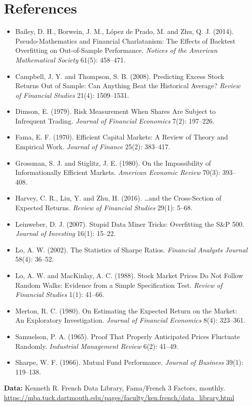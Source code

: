 \section*{References}

\begin{itemize}
  \item Bailey, D. H., Borwein, J. M., L\'opez de Prado, M. and Zhu, Q. J. (2014). Pseudo-Mathematics and Financial Charlatanism: The Effects of Backtest Overfitting on Out-of-Sample Performance. \emph{Notices of the American Mathematical Society} 61(5): 458--471.
  \item Campbell, J. Y. and Thompson, S. B. (2008). Predicting Excess Stock Returns Out of Sample: Can Anything Beat the Historical Average? \emph{Review of Financial Studies} 21(4): 1509--1531.
  \item Dimson, E. (1979). Risk Measurement When Shares Are Subject to Infrequent Trading. \emph{Journal of Financial Economics} 7(2): 197--226.
  \item Fama, E. F. (1970). Efficient Capital Markets: A Review of Theory and Empirical Work. \emph{Journal of Finance} 25(2): 383--417.
  \item Grossman, S. J. and Stiglitz, J. E. (1980). On the Impossibility of Informationally Efficient Markets. \emph{American Economic Review} 70(3): 393--408.
  \item Harvey, C. R., Liu, Y. and Zhu, H. (2016). \ldots and the Cross-Section of Expected Returns. \emph{Review of Financial Studies} 29(1): 5--68.
  \item Leinweber, D. J. (2007). Stupid Data Miner Tricks: Overfitting the S\&P 500. \emph{Journal of Investing} 16(1): 15--22.
  \item Lo, A. W. (2002). The Statistics of Sharpe Ratios. \emph{Financial Analysts Journal} 58(4): 36--52.
  \item Lo, A. W. and MacKinlay, A. C. (1988). Stock Market Prices Do Not Follow Random Walks: Evidence from a Simple Specification Test. \emph{Review of Financial Studies} 1(1): 41--66.
  \item Merton, R. C. (1980). On Estimating the Expected Return on the Market: An Exploratory Investigation. \emph{Journal of Financial Economics} 8(4): 323--361.
  \item Samuelson, P. A. (1965). Proof That Properly Anticipated Prices Fluctuate Randomly. \emph{Industrial Management Review} 6(2): 41--49.
  \item Sharpe, W. F. (1966). Mutual Fund Performance. \emph{Journal of Business} 39(1): 119--138.
\end{itemize}

\textbf{Data:} Kenneth R. French Data Library, Fama/French 3 Factors, monthly. \url{https://mba.tuck.dartmouth.edu/pages/faculty/ken.french/data_library.html}
